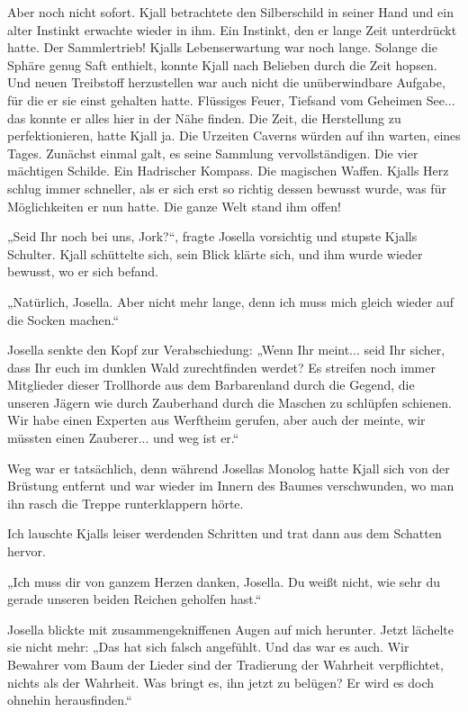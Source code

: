 Aber noch nicht sofort. Kjall betrachtete den Silberschild in seiner Hand und ein alter Instinkt erwachte wieder in ihm. Ein Instinkt, den er lange Zeit unterdrückt hatte. Der Sammlertrieb! Kjalls Lebenserwartung war noch lange. Solange die Sphäre genug Saft enthielt, konnte Kjall nach Belieben durch die Zeit hopsen. Und neuen Treibstoff herzustellen war auch nicht die unüberwindbare Aufgabe, für die er sie einst gehalten hatte. Flüssiges Feuer, Tiefsand vom Geheimen See... das konnte er alles hier in der Nähe finden. Die Zeit, die Herstellung zu perfektionieren, hatte Kjall ja. Die Urzeiten Caverns würden auf ihn warten, eines Tages. Zunächst einmal galt, es seine Sammlung vervollständigen. Die vier mächtigen Schilde. Ein Hadrischer Kompass. Die magischen Waffen. Kjalls Herz schlug immer schneller, als er sich erst so richtig dessen bewusst wurde, was für Möglichkeiten er nun hatte. Die ganze Welt stand ihm offen!\bigskip



„Seid Ihr noch bei uns, Jork?“, fragte Josella vorsichtig und stupste Kjalls Schulter. Kjall schüttelte sich, sein Blick klärte sich, und ihm wurde wieder bewusst, wo er sich befand.

„Natürlich, Josella. Aber nicht mehr lange, denn ich muss mich gleich wieder auf die Socken machen.“

Josella senkte den Kopf zur Verabschiedung: „Wenn Ihr meint... seid Ihr sicher, dass Ihr euch im dunklen Wald zurechtfinden werdet? Es streifen noch immer Mitglieder dieser Trollhorde aus dem Barbarenland durch die Gegend, die unseren Jägern wie durch Zauberhand durch die Maschen zu schlüpfen schienen. Wir habe einen Experten aus Werftheim gerufen, aber auch der meinte, wir müssten einen Zauberer... und weg ist er.“

Weg war er tatsächlich, denn während Josellas Monolog hatte Kjall sich von der Brüstung entfernt und war wieder im Innern des Baumes verschwunden, wo man ihn rasch die Treppe runterklappern hörte.

Ich lauschte Kjalls leiser werdenden Schritten und trat dann aus dem Schatten hervor.

„Ich muss dir von ganzem Herzen danken, Josella. Du weißt nicht, wie sehr du gerade unseren beiden Reichen geholfen hast.“

Josella blickte mit zusammengekniffenen Augen auf mich herunter. Jetzt lächelte sie nicht mehr: „Das hat sich falsch angefühlt. Und das war es auch. Wir Bewahrer vom Baum der Lieder sind der Tradierung der Wahrheit verpflichtet, nichts als der Wahrheit. Was bringt es, ihn jetzt zu belügen? Er wird es doch ohnehin herausfinden.“

